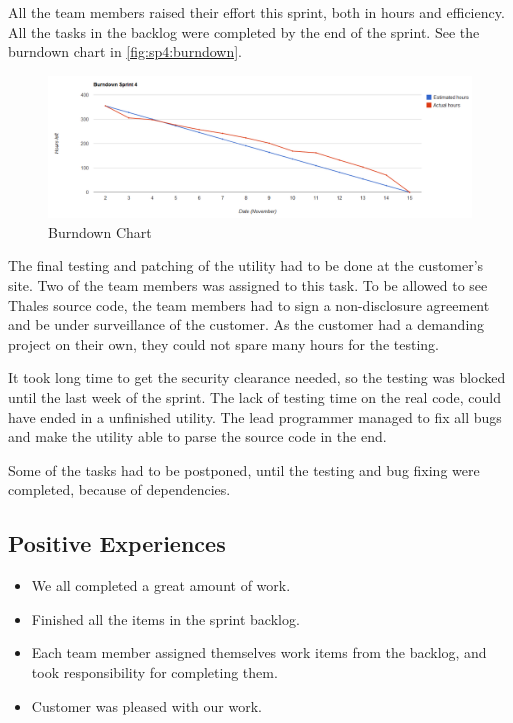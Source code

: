 All the team members raised their effort this sprint, both in hours and efficiency. All the tasks in the backlog were completed by the end of the sprint. See the burndown chart in \autoref{fig:sp4:burndown}.
\begin{figure}[!htb]
	\includegraphics[width=\textwidth]{./sprints/img/burndown_chart_s4}
	\caption{Burndown Chart\label{fig:sp4:burndown}}
\end{figure}

The final testing and patching of the utility had to be done at the customer's site. Two of the team members was assigned to this task. To be allowed to see Thales source code, the team members had to sign a non-disclosure agreement and be under surveillance of the customer. As the customer had a demanding project on their own, they could not spare many hours for the testing.

It took long time to get the security clearance needed, so the testing was blocked until the last week of the sprint. The lack of testing time on the real code, could have ended in a unfinished utility. The lead programmer managed to fix all bugs and make the utility able to parse the source code in the end.

Some of the tasks had to be postponed, until the testing and bug fixing were completed, because of dependencies. 

\subsection{Positive Experiences}
\begin{itemize}
\item We all completed a great amount of work.
\item Finished all the items in the sprint backlog.
\item Each team member assigned themselves work items from the backlog, and took responsibility for completing them.
\item Customer was pleased with our work.
\end{itemize}

